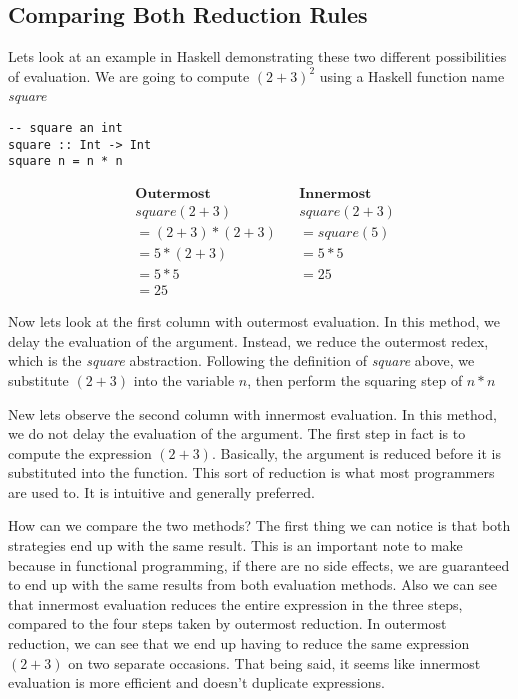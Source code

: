 \documentclass{article}
\begin{document}
\subsection{Comparing Both Reduction Rules}
\medskip\noindent
Lets look at an example in Haskell demonstrating these two different possibilities of evaluation. We are going to compute  ${(2+3)}^2$ using a Haskell function name \textit{square}

\begin{lstlisting}
-- square an int
square :: Int -> Int
square n = n * n
\end{lstlisting}
\noindent\begin{align*}
&\textbf{Outermost}  &  &\textbf{Innermost}  \\
&square (2+3)   &   &square (2+3)  \\
&=(2+3)*(2+3)   &   &=square (5)\\
&=5 * (2+3)   &    &=5 * 5  \\
&=5 * 5   &    &=25 \\
&=25   
\end{align*}

\medskip\noindent
Now lets look at the first column with outermost evaluation. In this method, we delay the evaluation of the argument. Instead, we reduce the outermost redex, which is the \textit{square} abstraction. Following the definition of \textit{square} above, we substitute $(2+3)$ into the variable $n$, then perform the squaring step of $n*n$

\medskip\noindent
New lets observe the second column with innermost evaluation. In this method, we do not delay the evaluation of the argument. The first step in fact is to compute the expression $(2+3)$. Basically, the argument is reduced before it is substituted into the function. This sort of reduction is what most programmers are used to. It is intuitive and generally preferred. 

\medskip\noindent
How can we compare the two methods? The first thing we can notice is that both strategies end up with the same result. This is an important note to make because in functional programming, if there are no side effects, we are guaranteed to end up with the same results from both evaluation methods. Also we can see that innermost evaluation reduces the entire expression in the three steps, compared to the four steps taken by outermost reduction. In outermost reduction, we can see that we end up having to reduce the same expression $(2+3)$ on two separate occasions. That being said, it seems like innermost evaluation is more efficient and doesn't duplicate expressions. 
\end{document}
